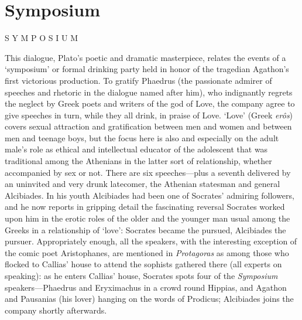 \part[symposium]{Symposium}

\noindent\centerline{ S\kern 5.5pt%
                                 Y\kern 5.5pt%
                                 M\kern 6pt%
                                 P\kern 4pt%
                                 O\kern 4.5pt%
                                 S\kern 6pt%
                                 I\kern 5.5pt%
                                 U\kern 5pt%
                                 M}

\startchapter[title=Foreword]

This dialogue, Plato's poetic and dramatic masterpiece, relates the
events of a ‘symposium' or formal drinking party held in honor of
the tragedian Agathon's first victorious production. To gratify
Phaedrus (the passionate admirer of speeches and rhetoric in the
dialogue named after him), who indignantly regrets the neglect by
Greek poets and writers of the god of Love, the company agree to
give speeches in turn, while they all drink, in praise of Love. ‘Love'
(Greek {\em erôs}) covers sexual attraction and gratification
between men and women and between men and teenage boys, but the
focus here is also and especially on the adult male's role as
ethical and intellectual educator of the adolescent that was
traditional among the Athenians in the latter sort of relationship,
whether accompanied by sex or not. There are six speeches---plus a
seventh delivered by an uninvited and very drunk latecomer, the
Athenian statesman and general Alcibiades. In his youth Alcibiades
had been one of Socrates' admiring followers, and he now reports
in gripping detail the fascinating reversal Socrates worked upon
him in the erotic roles of the older and the younger man usual
among the Greeks in a relationship of ‘love': Socrates became the
pursued, Alcibiades the pursuer. Appropriately enough, all the
speakers, with the interesting exception of the comic poet
Aristophanes, are mentioned in {\em Protagoras} as among those who
flocked to Callias' house to attend the sophists gathered there
(all experts on speaking): as he enters Callias' house, Socrates spots 
four of the {\em Symposium} speakers---Phaedrus and Eryximachus in
a crowd round Hippias, and Agathon and Pausanias (his lover)
hanging on the words of Prodicus; Alcibiades joins the company
shortly afterwards.

